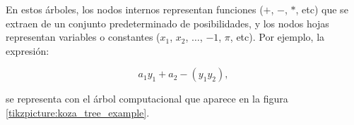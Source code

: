 En estos árboles, los nodos internos representan funciones ($+$, $-$, $*$, etc) que se extraen de un conjunto predeterminado de posibilidades, y los nodos hojas representan variables o constantes ($x_1$, $x_2$, $\dots$, $-1$, $\pi$, etc). Por ejemplo, la expresión:

$$a_1 y_1 + a_2 -(y_1 y_2),$$

se representa con el árbol computacional que aparece en la figura \ref{tikzpicture:koza_tree_example}.

\begin{center}


\end{center}

